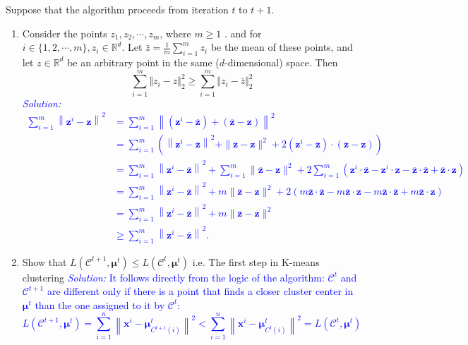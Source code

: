 \documentclass{article}
\def\solColor{blue}
\begin{document}
Suppose that the algorithm proceeds from iteration $t$ to $t+1$.
\begin{enumerate}
    \item Consider the points $z_1, z_2, \cdots, z_m$, where $m\geq 1$ . and for $i\in\{1, 2, \cdots, m\}, z_i\in \mathbb{R}^d$. Let $\bar{z} = \frac{1}{m}\sum_{i=1}^m z_i$ be the mean of these points, and let $z\in \mathbb{R}^d$ be an arbitrary point in the same ($d$-dimensional) space. Then
    $$
    \sum_{i=1}^m \Vert z_i - z\Vert^2_2 \geq \sum_{i=1}^m \Vert z_i - \bar{z}\Vert^2_2
    $$
    \textcolor{\solColor}{\textit{Solution:}
    $$
\begin{aligned}
\sum_{i=1}^m\left\|\boldsymbol{z}^i-\boldsymbol{z}\right\|^2 &=\sum_{i=1}^m\left\|\left(\boldsymbol{z}^i-\overline{\boldsymbol{z}}\right)+(\overline{\boldsymbol{z}}-\boldsymbol{z})\right\|^2 \\
&=\sum_{i=1}^m\left(\left\|\boldsymbol{z}^i-\overline{\boldsymbol{z}}\right\|^2+\|\overline{\boldsymbol{z}}-\boldsymbol{z}\|^2+2\left(\boldsymbol{z}^i-\overline{\boldsymbol{z}}\right) \cdot(\overline{\boldsymbol{z}}-\boldsymbol{z})\right) \\
&=\sum_{i=1}^m\left\|\boldsymbol{z}^i-\overline{\boldsymbol{z}}\right\|^2+\sum_{i=1}^m\|\overline{\boldsymbol{z}}-\boldsymbol{z}\|^2+2 \sum_{i=1}^m\left(\boldsymbol{z}^i \cdot \overline{\boldsymbol{z}}-\boldsymbol{z}^i \cdot \boldsymbol{z}-\overline{\boldsymbol{z}} \cdot \overline{\boldsymbol{z}}+\overline{\boldsymbol{z}} \cdot \boldsymbol{z}\right) \\
&=\sum_{i=1}^m\left\|\boldsymbol{z}^i-\overline{\boldsymbol{z}}\right\|^2+m\|\overline{\boldsymbol{z}}-\boldsymbol{z}\|^2+2(m \overline{\boldsymbol{z}} \cdot \overline{\boldsymbol{z}}-m \overline{\boldsymbol{z}} \cdot \boldsymbol{z}-m \overline{\boldsymbol{z}} \cdot \overline{\boldsymbol{z}}+m \overline{\boldsymbol{z}} \cdot \boldsymbol{z}) \\
&=\sum_{i=1}^m\left\|\boldsymbol{z}^i-\overline{\boldsymbol{z}}\right\|^2+m\|\overline{\boldsymbol{z}}-\boldsymbol{z}\|^2 \\
& \geq \sum_{i=1}^m\left\|\boldsymbol{z}^i-\overline{\boldsymbol{z}}\right\|^2 .
\end{aligned}
$$
    }
    \item Show that $L(\mathcal{C}^{t+1}, \boldsymbol{\mu}^{t}) \leq L(\mathcal{C}^{t}, \boldsymbol{\mu}^{t})$ i.e. The first step in K-means clustering
    \textcolor{\solColor}{\textit{Solution:}
    It follows directly from the logic of the algorithm: $\mathcal{C}^t$ and $\mathcal{C}^{t+1}$ are different only if there is a point that finds a closer cluster center in $\boldsymbol{\mu}^t$ than the one assigned to it by $\mathcal{C}^t$:
$$
L\left(\mathcal{C}^{t+1}, \boldsymbol{\mu}^t\right)=\sum_{i=1}^n\left\|\boldsymbol{x}^i-\boldsymbol{\mu}_{C^{t+1}(i)}^t\right\|^2<\sum_{i=1}^n\left\|\boldsymbol{x}^i-\boldsymbol{\mu}_{C^t(i)}^t\right\|^2=L\left(\mathcal{C}^t, \boldsymbol{\mu}^t\right)
$$
    }


\end{enumerate}
\end{document}

